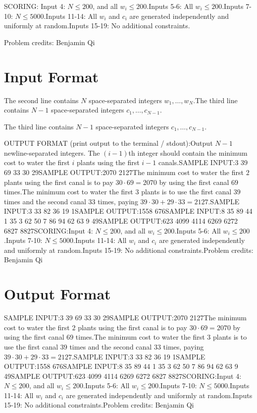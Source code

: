 \documentclass[12pt]{article}
\begin{document}
SCORING:
Input 4: $N \leq 200$, and all $w_i \leq 200$.Inputs 5-6: All $w_i \leq 200$.Inputs 7-10: $N \leq 5000$.Inputs 11-14: All $w_i$ and $c_i$ are generated independently and uniformly
at random.Inputs 15-19: No additional constraints.


Problem credits: Benjamin Qi



\section*{Input Format}
The second line contains $N$ space-separated integers $w_1, \ldots, w_N$.The third line contains $N-1$ space-separated integers $c_1, \ldots, c_{N-1}$.

The third line contains $N-1$ space-separated integers $c_1, \ldots, c_{N-1}$.

OUTPUT FORMAT (print output to the terminal / stdout):Output $N-1$ newline-separated integers. The $(i-1)$th integer should contain
the minimum cost to water the first $i$ plants using the first $i-1$ canals.SAMPLE INPUT:3
39 69 33
30 29SAMPLE OUTPUT:2070
2127The minimum cost to water the first $2$ plants using the first canal is to pay
$30 \cdot 69 = 2070$ by using the first canal $69$ times.The minimum cost to water the first $3$ plants is to use the first canal $39$
times and the second canal $33$ times, paying
$39 \cdot 30 + 29 \cdot 33 = 2127$.SAMPLE INPUT:3
33 82 36
19 1SAMPLE OUTPUT:1558
676SAMPLE INPUT:8
35 89 44 1 35 3 62 50
7 86 94 62 63 9 49SAMPLE OUTPUT:623
4099
4114
6269
6272
6827
8827SCORING:Input 4: $N \leq 200$, and all $w_i \leq 200$.Inputs 5-6: All $w_i \leq 200$.Inputs 7-10: $N \leq 5000$.Inputs 11-14: All $w_i$ and $c_i$ are generated independently and uniformly
at random.Inputs 15-19: No additional constraints.Problem credits: Benjamin Qi

\section*{Output Format}
SAMPLE INPUT:3
39 69 33
30 29SAMPLE OUTPUT:2070
2127The minimum cost to water the first $2$ plants using the first canal is to pay
$30 \cdot 69 = 2070$ by using the first canal $69$ times.The minimum cost to water the first $3$ plants is to use the first canal $39$
times and the second canal $33$ times, paying
$39 \cdot 30 + 29 \cdot 33 = 2127$.SAMPLE INPUT:3
33 82 36
19 1SAMPLE OUTPUT:1558
676SAMPLE INPUT:8
35 89 44 1 35 3 62 50
7 86 94 62 63 9 49SAMPLE OUTPUT:623
4099
4114
6269
6272
6827
8827SCORING:Input 4: $N \leq 200$, and all $w_i \leq 200$.Inputs 5-6: All $w_i \leq 200$.Inputs 7-10: $N \leq 5000$.Inputs 11-14: All $w_i$ and $c_i$ are generated independently and uniformly
at random.Inputs 15-19: No additional constraints.Problem credits: Benjamin Qi
\end{document}
